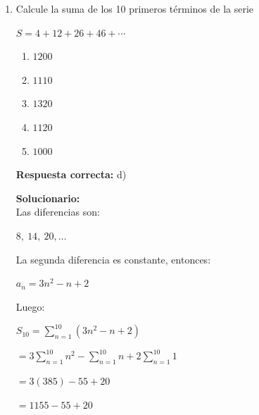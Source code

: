 \begin{enumerate}
	\vspace{2mm}
	\textbf{Solucionario:}\\
	Cada parcela tiene lado:
	
	$\sqrt{121}=11\ m$
	
	Si el rectángulo tiene $m$ parcelas por un lado y $n$ por el otro:
	
	$mn=108$
	
	y el número de postes es:
	
	$(m+1)(n+1)=130$
	
	$mn+m+n+1=130$
	
	$108+m+n+1=130$
	
	$m+n=21$
	
	Los números que cumplen:
	
	$m=9,\quad n=12$
	
	La diferencia de dimensiones es:
	
	$(12-9)\cdot 11=33\ m$
	
	
	\vspace{6mm}
	
	\item Calcule la suma de los 10 primeros términos de la serie
	
	$S=4+12+26+46+\cdots$
	\begin{enumerate}[label=\alph*)]
		\item $1200$
		\item $1110$
		\item $1320$
		\item $1120$
		\item $1000$
	\end{enumerate}
	\textbf{Respuesta correcta:} d)
	
	\vspace{2mm}
	\textbf{Solucionario:}\\
	Las diferencias son:
	
	$8,\ 14,\ 20,\dots$
	
	La segunda diferencia es constante, entonces:
	
	$a_n=3n^2-n+2$
	
	Luego:
	
	$S_{10}=\sum_{n=1}^{10}(3n^2-n+2)$
	
	$=3\sum_{n=1}^{10}n^2-\sum_{n=1}^{10}n+2\sum_{n=1}^{10}1$
	
	$=3(385)-55+20$
	
	$=1155-55+20$
	
	
	\vspace{6mm}
	

\end{enumerate}

